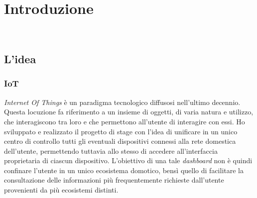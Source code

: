 
\chapter{Introduzione}
\label{cap:introduzione}

\\

%
%

\section{L'idea}

\subsection{IoT}
\label{intro-iot}

\emph{Internet Of Things} è un paradigma tecnologico diffusosi nell'ultimo decennio. Questa locuzione fa riferimento a un insieme di oggetti,
di varia natura e utilizzo, che interagiscono tra loro e che permettono all'utente di interagire con essi.
Ho sviluppato e realizzato il progetto di stage con l'idea di unificare in un unico centro di controllo tutti gli eventuali dispositivi connessi alla rete domestica dell'utente, permettendo tuttavia allo stesso di accedere all'interfaccia proprietaria di ciascun dispositivo.
L'obiettivo di una tale \emph{dashboard} non è quindi confinare l'utente in un unico ecosistema domotico,
bensì quello di facilitare la consultazione delle informazioni più frequentemente richieste dall'utente provenienti da più ecosistemi distinti.

